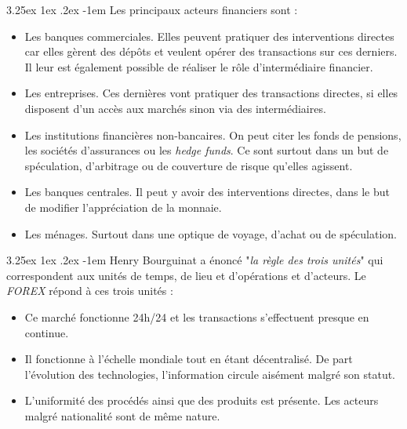 \documentclass[a4paper, 11pt]{article}
\makeatletter
\renewcommand\paragraph{\@startsection{paragraph}{5}{\z@}%
  {3.25ex \@plus1ex \@minus.2ex}%
  {-1em}%
  {\normalfont\normalsize\bfseries}}
\makeatother
\begin{document}
\paragraph{}
Les principaux acteurs financiers sont \cite{marche_des_changes}:
\begin{itemize}
\item Les banques commerciales. 
Elles peuvent pratiquer des interventions directes car elles gèrent des dépôts et veulent opérer des transactions sur ces derniers.
Il leur est également possible de réaliser le rôle d'intermédiaire financier.

\item Les entreprises. Ces dernières vont pratiquer des transactions directes, si elles disposent d'un accès aux marchés
sinon via des intermédiaires.

\item Les institutions financières non-bancaires. On peut citer les fonds de pensions, les sociétés d'assurances
ou les \textit{hedge funds}. Ce sont surtout dans un but de spéculation, d'arbitrage ou de couverture de risque qu'elles agissent.

\item Les banques centrales. Il peut y avoir des interventions directes, dans le but de modifier l'appréciation de la monnaie.

\item Les ménages. Surtout dans une optique de voyage, d'achat ou de spéculation.
\end{itemize}

\paragraph{}
Henry Bourguinat a énoncé "\textit{la règle des trois unités}" qui correspondent aux unités de temps, de lieu 
et d'opérations et d'acteurs.
Le \textit{FOREX} répond à ces trois unités \cite{site_fr_forex}:
\begin{itemize}
\item Ce marché fonctionne 24h/24 et les transactions s'effectuent presque en continue.

\item Il fonctionne à l'échelle mondiale tout en étant décentralisé. 
De part l'évolution des technologies, l'information circule aisément malgré son statut.

\item L'uniformité des procédés ainsi que des produits est présente. Les acteurs malgré nationalité sont de même nature.
\end{itemize}
\end{document}
